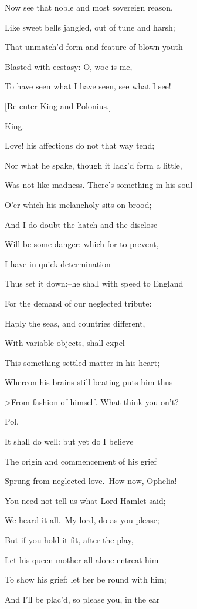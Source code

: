 \documentclass[12pt]{book}
\begin{document}
Now see that noble and most sovereign reason,

Like sweet bells jangled, out of tune and harsh;

That unmatch'd form and feature of blown youth

Blasted with ecstasy: O, woe is me,

To have seen what I have seen, see what I see!



[Re-enter King and Polonius.]



King.

Love! his affections do not that way tend;

Nor what he spake, though it lack'd form a little,

Was not like madness. There's something in his soul

O'er which his melancholy sits on brood;

And I do doubt the hatch and the disclose

Will be some danger: which for to prevent,

I have in quick determination

Thus set it down:--he shall with speed to England

For the demand of our neglected tribute:

Haply the seas, and countries different,

With variable objects, shall expel

This something-settled matter in his heart;

Whereon his brains still beating puts him thus

>From fashion of himself. What think you on't?



Pol.

It shall do well: but yet do I believe

The origin and commencement of his grief

Sprung from neglected love.--How now, Ophelia!

You need not tell us what Lord Hamlet said;

We heard it all.--My lord, do as you please;

But if you hold it fit, after the play,

Let his queen mother all alone entreat him

To show his grief: let her be round with him;

And I'll be plac'd, so please you, in the ear
\end{document}
